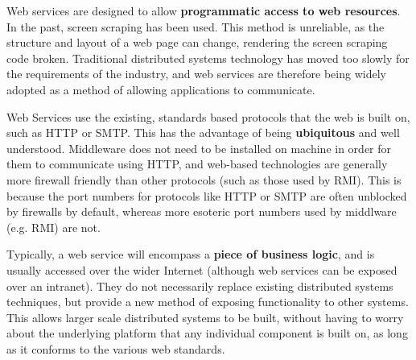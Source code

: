 \documentclass{article}
\begin{document}
Web services are designed to allow \textbf{programmatic access to web resources}. In the past, screen scraping has been used. This method is unreliable, as the structure and layout of a web page can change, rendering the screen scraping code broken. Traditional distributed systems technology has moved too slowly for the requirements of the industry, and web services are therefore being widely adopted as a method of allowing applications to communicate.

Web Services use the existing, standards based protocols that the web is built on, such as HTTP or SMTP. This has the advantage of being \textbf{ubiquitous} and well understood. Middleware does not need to be installed on machine in order for them to communicate using HTTP, and web-based technologies are generally more firewall friendly than other protocols (such as those used by RMI). This is because the port numbers for protocols like HTTP or SMTP are often unblocked by firewalls by default, whereas more esoteric port numbers used by middlware (e.g. RMI) are not.

Typically, a web service will encompass a \textbf{piece of business logic}, and is usually accessed over the wider Internet (although web services can be exposed over an intranet). They do not necessarily replace existing distributed systems techniques, but provide a new method of exposing functionality to other systems. This allows larger scale distributed systems to be built, without having to worry about the underlying platform that any individual component is built on, as long as it conforms to the various web standards.
\end{document}

